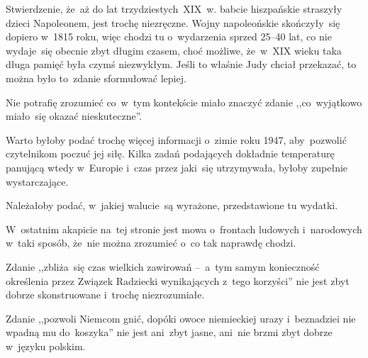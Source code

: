 \documentclass[a4paper,11pt]{article}
\begin{document}



\start {} Stwierdzenie, że~aż do lat trzydziestych~XIX~w. babcie
hiszpańskie straszyły dzieci Napoleonem, jest trochę niezręczne. Wojny
napoleońskie skończyły~się dopiero w~1815 roku, więc chodzi tu
o~wydarzenia sprzed 25--40 lat, co nie wydaje~się obecnie zbyt długim
czasem, choć możliwe, że~w~XIX wieku taka długa pamięć była czymś
niezwykłym. Jeśli to właśnie Judy chciał przekazać, to można było
to~zdanie sformułować lepiej.

\vspace{\spaceFour}


\start {} Nie potrafię zrozumieć co~w~tym kontekście miało
znaczyć zdanie ,,co~wyjątkowo miało~się okazać nieskuteczne''.

\vspace{\spaceFour}


\start {} Warto byłoby podać trochę więcej informacji o~zimie
roku 1947, aby~pozwolić czytelnikom poczuć jej siłę. Kilka zadań
podających dokładnie temperaturę panującą wtedy w~Europie i~czas przez
jaki~się utrzymywała, byłoby zupełnie wystarczające.

\vspace{\spaceFour}


\start {} Należałoby podać, w~jakiej walucie~są wyrażone,
przedstawione tu wydatki.

\vspace{\spaceFour}


\start {} W~ostatnim akapicie na~tej stronie jest mowa
o~frontach ludowych i~narodowych w~taki sposób, że~nie można zrozumieć
o~co tak naprawdę chodzi.

\vspace{\spaceFour}


\start {} Zdanie ,,zbliża~się czas wielkich zawirowań
--~a~tym samym konieczność określenia przez Związek Radziecki
wynikających z~tego korzyści'' nie jest zbyt dobrze skonstruowane
i~trochę niezrozumiałe.

\vspace{\spaceFour}


\start {} Zdanie ,,pozwoli Niemcom gnić, dopóki owoce
niemieckiej urazy i~beznadziei nie wpadną mu do~koszyka'' nie jest
ani~zbyt jasne, ani~nie brzmi zbyt dobrze w~języku polskim.
\end{document}
